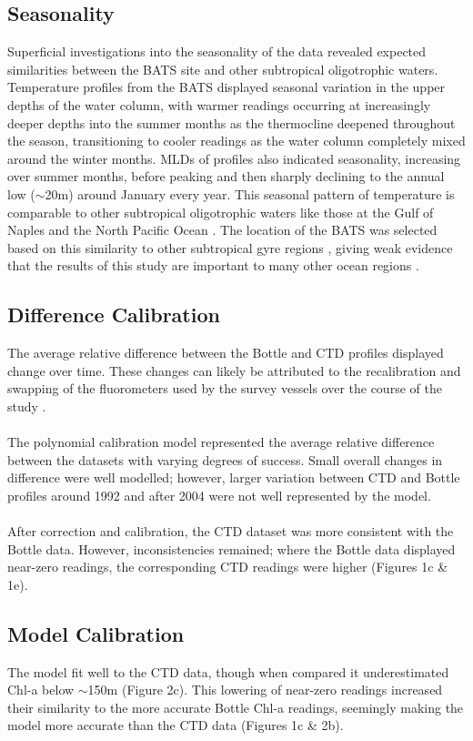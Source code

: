 \documentclass{article}
\begin{document}
\subsection{Seasonality}
Superficial investigations into the seasonality of the data revealed expected similarities between the BATS site and other subtropical oligotrophic waters. Temperature profiles from the BATS displayed seasonal variation in the upper depths of the water column, with warmer readings occurring at increasingly deeper depths into the summer months as the thermocline deepened throughout the season, transitioning to cooler readings as the water column completely mixed around the winter months. MLDs of profiles also indicated seasonality, increasing over summer months, before peaking and then sharply declining to the annual low ($\sim$20m) around January every year. This seasonal pattern of temperature is comparable to other subtropical oligotrophic waters like those at the Gulf of Naples and the North Pacific Ocean \citep{peralba_vertical_2004,dore_seasonal_2002}. The location of the BATS was selected based on this similarity to other subtropical gyre regions \citep{alkire_using_2013}, giving weak evidence that the results of this study are important to many other ocean regions \citep{morel_most_2010}.
\subsection{Difference Calibration}
The average relative difference between the Bottle and CTD profiles displayed change over time. These changes can likely be attributed to the recalibration and swapping of the fluorometers used by the survey vessels over the course of the study \citep{johnson_chapter_nodate-1}. \\ \\
The polynomial calibration model represented the average relative difference between the datasets with varying degrees of success. Small overall changes in difference were well modelled; however, larger variation between CTD and Bottle profiles around 1992 and after 2004 were not well represented by the model. \\ \\
After correction and calibration, the CTD dataset was more consistent with the Bottle data. However, inconsistencies remained; where the Bottle data displayed near-zero readings, the corresponding CTD readings were higher (Figures 1c \& 1e). 
\subsection{Model Calibration}
The model fit well to the CTD data, though when compared it underestimated Chl-a below $\sim$150m (Figure 2c). This lowering of near-zero readings increased their similarity to the more accurate Bottle Chl-a readings, seemingly making the model more accurate than the CTD data (Figures 1c \& 2b).
\end{document}
